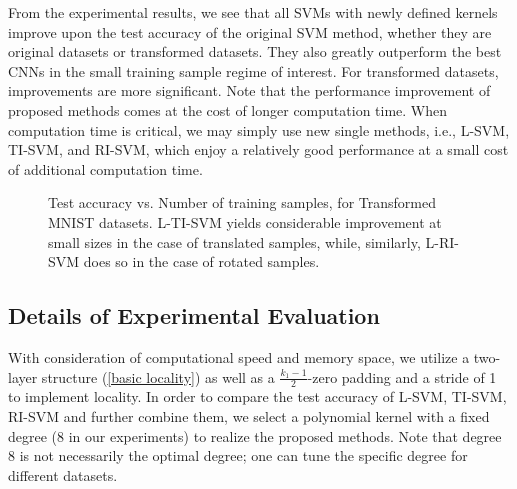 \documentclass{article}
\theoremstyle{plain}
\theoremstyle{definition}
\theoremstyle{remark}
\begin{document}
From the experimental results, we see that all SVMs with newly defined kernels improve upon the test accuracy of the original SVM method, whether they are original datasets or transformed datasets. They also greatly outperform the best CNNs in the small training sample regime of interest. For transformed datasets, improvements are more significant. Note that the performance improvement of proposed methods comes at the cost of longer computation time. When computation time is critical, we may simply use new single methods, i.e., L-SVM, TI-SVM, and RI-SVM, which enjoy a relatively good performance at a small cost of additional computation time.

\begin{figure}
     \quad \quad \quad
\caption{Test accuracy vs. Number of training samples, for Transformed MNIST datasets. L-TI-SVM yields considerable improvement at small sizes in the case of translated samples, while, similarly, L-RI-SVM does so in the case of rotated samples.}
\label{size}
\end{figure}


\subsection{Details of Experimental Evaluation}
\label{subsec:exp_detail}
With consideration of computational speed and memory space, we utilize a two-layer structure (\ref{basic locality}) as well as a $\frac{k_1-1}{2}$-zero padding and a stride of 1 to implement locality. In order to compare the test accuracy of L-SVM, TI-SVM, RI-SVM and further combine them, we select a polynomial kernel with a fixed degree (8 in our experiments) to realize the proposed methods. Note that degree 8 is not necessarily the optimal degree; one can tune the specific degree for different datasets. 
\end{document}
